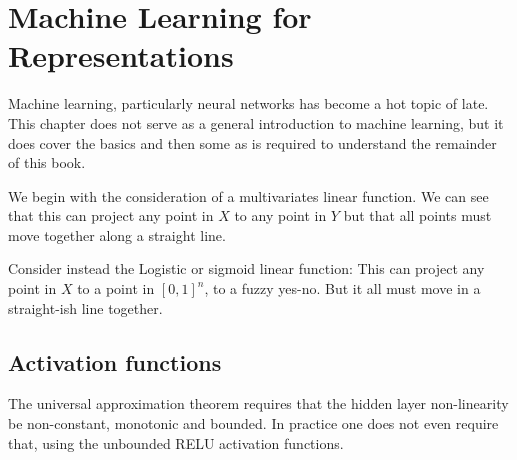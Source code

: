 \documentclass[12pt,parskip]{komatufte}
\begin{document}
	

\chapter{Machine Learning for Representations}\label{sec:machine-learning-for-representations}


Machine learning, particularly neural networks has become a hot topic of late.
This chapter does not serve as a general introduction to machine learning,
but it does cover the basics and then some as is required to understand the remainder of this book.


We begin with the consideration of a multivariates linear function.
We can see that this can project any point in $X$ to any point in $Y$ but that all points must move together along a straight line.

Consider instead the Logistic or sigmoid linear function:
This can project any point in $X$ to a point in $[0,1]^n$,
to a fuzzy yes-no.
But it all must move in a straight-ish line together.



\section{Activation functions}

The universal approximation theorem requires that the hidden layer non-linearity be non-constant, monotonic and bounded.
In practice one does not even require that, using the unbounded RELU activation functions.
\end{document}
